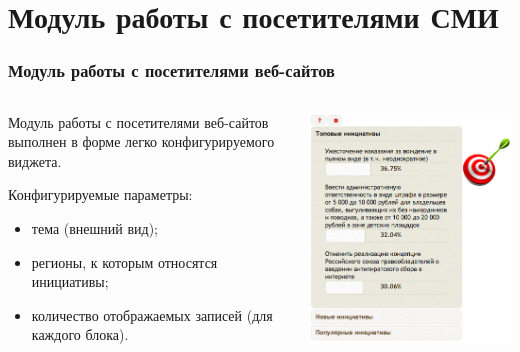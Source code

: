 \documentclass{beamer}
\begin{document}
\section{Модуль работы с посетителями СМИ}
\begin{frame}
\frametitle{Модуль работы с посетителями веб-сайтов}
\begin{columns}[T]
\begin{column}{0.55\textwidth}
Модуль работы с посетителями веб-сайтов выполнен в форме легко конфигурируемого виджета.

\vspace{0.5cm}
Конфигурируемые параметры:
\begin{itemize}
  \item тема (внешний вид);
  \item регионы, к которым относятся инициативы;
  \item количество отображаемых записей (для каждого блока).
\end{itemize}
\end{column}
\begin{column}{0.45\textwidth}
\vspace{0.5cm}
\includegraphics[width=1.0\textwidth]{images/widget}
\end{column}
\end{columns}
\end{frame}
\end{document}
